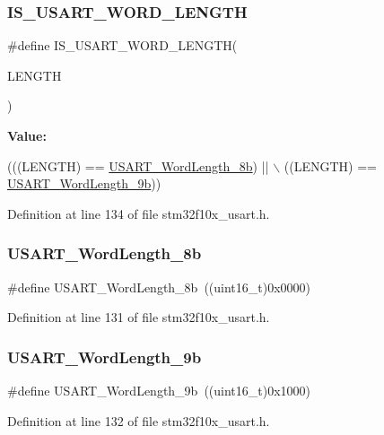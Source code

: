 \subsubsection{\texorpdfstring{I\+S\+\_\+\+U\+S\+A\+R\+T\+\_\+\+W\+O\+R\+D\+\_\+\+L\+E\+N\+G\+TH}{IS\_USART\_WORD\_LENGTH}}
{\footnotesize\ttfamily \#define I\+S\+\_\+\+U\+S\+A\+R\+T\+\_\+\+W\+O\+R\+D\+\_\+\+L\+E\+N\+G\+TH(\begin{DoxyParamCaption}\item[{}]{L\+E\+N\+G\+TH }\end{DoxyParamCaption})}

{\bfseries Value\+:}
\begin{DoxyCode}
(((LENGTH) == \hyperlink{group___u_s_a_r_t___word___length_ga08682faddc657df85a93627b5a146c25}{USART\_WordLength\_8b}) || \(\backslash\)
                                      ((LENGTH) == \hyperlink{group___u_s_a_r_t___word___length_gae7dd162142660e09e2321aa3f33dc4d2}{USART\_WordLength\_9b}))
\end{DoxyCode}


Definition at line 134 of file stm32f10x\+\_\+usart.\+h.

\mbox{\label{group___u_s_a_r_t___word___length_ga08682faddc657df85a93627b5a146c25}} 
\subsubsection{\texorpdfstring{U\+S\+A\+R\+T\+\_\+\+Word\+Length\+\_\+8b}{USART\_WordLength\_8b}}
{\footnotesize\ttfamily \#define U\+S\+A\+R\+T\+\_\+\+Word\+Length\+\_\+8b~((uint16\+\_\+t)0x0000)}



Definition at line 131 of file stm32f10x\+\_\+usart.\+h.

\mbox{\label{group___u_s_a_r_t___word___length_gae7dd162142660e09e2321aa3f33dc4d2}} 
\subsubsection{\texorpdfstring{U\+S\+A\+R\+T\+\_\+\+Word\+Length\+\_\+9b}{USART\_WordLength\_9b}}
{\footnotesize\ttfamily \#define U\+S\+A\+R\+T\+\_\+\+Word\+Length\+\_\+9b~((uint16\+\_\+t)0x1000)}



Definition at line 132 of file stm32f10x\+\_\+usart.\+h.

